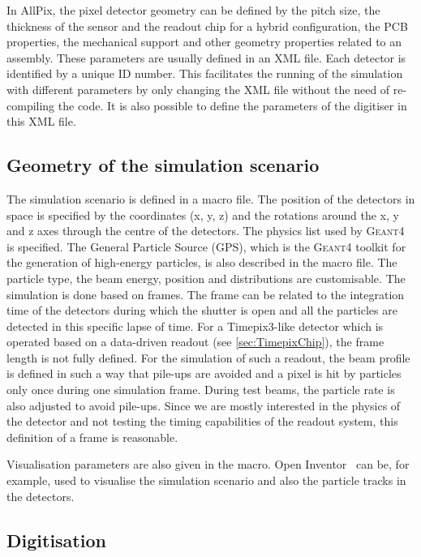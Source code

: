In AllPix, the pixel detector geometry can be defined by the pitch
size, the thickness of the sensor and the readout chip for a hybrid
configuration, the PCB properties, the mechanical support and other
geometry properties related to an assembly. These parameters are
usually defined in an XML file. Each detector is identified by a
unique ID number. This facilitates the running of the simulation with
different parameters by only changing the XML file without the need of
re-compiling the code. It is also possible to define the parameters of
the digitiser in this XML file.
\subsection{Geometry of the simulation scenario}

The simulation scenario is defined in a macro file. The position of
the detectors in space is specified by the coordinates (x, y, z) and
the rotations around the x, y and z axes through the centre of the
detectors. The physics list used by \textsc{Geant4} is specified. The
General Particle Source (GPS), which is the \textsc{Geant4} toolkit
for the generation of high-energy particles, is also described in the
macro file. The particle type, the beam energy, position and
distributions are customisable. The simulation is done based on
frames. The frame can be related to the integration time of the
detectors during which the shutter is open and all the particles are
detected in this specific lapse of time. For a Timepix3-like detector
which is operated based on a data-driven readout (see
\cref{sec:TimepixChip}), the frame length is not fully defined. For
the simulation of such a readout, the beam profile is defined in such
a way that pile-ups are avoided and a pixel is hit by particles only
once during one simulation frame. During test beams, the particle rate
is also adjusted to avoid pile-ups. Since we are mostly interested in
the physics of the detector and not testing the timing capabilities of
the readout system, this definition of a frame is reasonable.

Visualisation parameters are also given in the macro. Open
Inventor~\cite{OpenInventor} can be, for example, used to visualise
the simulation scenario and also the particle tracks in the detectors.

\subsection{Digitisation}
\label{sec:allpix_digitisation}

